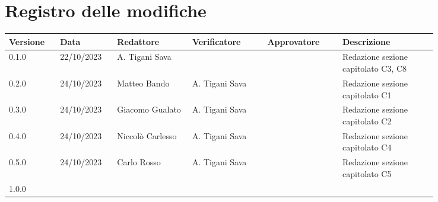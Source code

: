 \section{Registro delle modifiche}
{
\renewcommand{\arraystretch}{1.5}
\scriptsize
\begin{tabular}{p{0.10\linewidth}p{0.10\linewidth}p{0.15\linewidth}p{0.15\linewidth}p{0.15\linewidth}p{0.19\linewidth}}
    \textbf{Versione}   & \textbf{Data} & \textbf{Redattore}    & \textbf{Verificatore} & \textbf{Approvatore}  & \textbf{Descrizione}  \\
    \hline
    0.1.0               & 22/10/2023    & A. Tigani Sava        &                       &                       & Redazione sezione capitolato C3, C8  	\\
    0.2.0               & 24/10/2023    & Matteo Bando          & A. Tigani Sava		&                       & Redazione sezione capitolato C1		\\
    0.3.0               & 24/10/2023    & Giacomo Gualato       & A. Tigani Sava		&                       & Redazione sezione capitolato C2		\\
    0.4.0               & 24/10/2023    & Niccolò Carlesso      & A. Tigani Sava		&                       & Redazione sezione capitolato C4   	\\
    0.5.0               & 24/10/2023    & Carlo Rosso           & A. Tigani Sava		&                       & Redazione sezione capitolato C5   	\\
    1.0.0 \\
    \hline
\end{tabular}
}